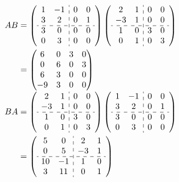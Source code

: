 	 \paragraph{} %
		 $\begin{aligned}
				 AB & = \left(\begin{array}{cc:cc}
					              1 & -1 & 0 & 0 \\
					              3 & 2  & 0 & 1 \\ \hdashline
					              3 & 0  & 0 & 0 \\
					              0 & 3  & 0 & 0
				              \end{array}\right)
				 \left(\begin{array}{cc:cc}
					       2  & 1 & 0 & 0 \\
					       -3 & 1 & 0 & 0 \\ \hdashline
					       1  & 0 & 3 & 0 \\
					       0  & 1 & 0 & 3
				       \end{array}\right)        \\
				    & = \begin{pmatrix}
					        6  & 0 & 3 & 0 \\
					        0  & 6 & 0 & 3 \\
					        6  & 3 & 0 & 0 \\
					        -9 & 3 & 0 & 0
				        \end{pmatrix}
			 \end{aligned}$
		 $\begin{aligned}
				 BA & = \left(\begin{array}{cc:cc}
					              2  & 1 & 0 & 0 \\
					              -3 & 1 & 0 & 0 \\ \hdashline
					              1  & 0 & 3 & 0 \\
					              0  & 1 & 0 & 3
				              \end{array}\right)
				 \left(\begin{array}{cc:cc}
					       1 & -1 & 0 & 0 \\
					       3 & 2  & 0 & 1 \\ \hdashline
					       3 & 0  & 0 & 0 \\
					       0 & 3  & 0 & 0
				       \end{array}\right)          \\
				    & = \left(\begin{array}{cc:cc}
					              5  & 0  & 2  & 1 \\
					              0  & 5  & -3 & 1 \\ \hdashline
					              10 & -1 & 1  & 0 \\
					              3  & 11 & 0  & 1
				              \end{array}\right)
			 \end{aligned}$
